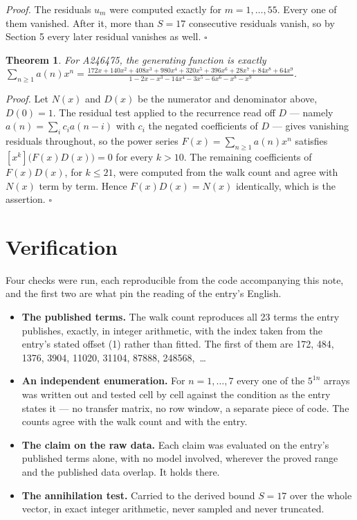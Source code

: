 \documentclass[11pt]{article}
\newtheorem{theorem}{Theorem}
\theoremstyle{definition}
\begin{document}
{\itshape Proof.} The residuals $u_m$ were computed exactly for $m = 1,\dots,55$. Every one of them vanished. After it, more than $S = 17$ consecutive residuals vanish, so by Section 5 every later residual vanishes as well. $\square$

\begin{theorem} For A246475, the generating function is exactly $\sum_{n\ge 1} a(n)x^n = \frac{172x + 140x^{2} + 408x^{3} + 980x^{4} + 320x^{5} + 396x^{6} + 28x^{7} + 84x^{8} + 64x^{9}}{1 - 2x - x^{3} - 14x^{4} - 3x^{5} - 6x^{6} - x^{8} - x^{9}}$.\end{theorem}

{\itshape Proof.} Let $N(x)$ and $D(x)$ be the numerator and denominator above, $D(0)=1$. The residual test applied to the recurrence read off $D$ --- namely $a(n) = \sum_i c_i a(n-i)$ with $c_i$ the negated coefficients of $D$ --- gives vanishing residuals throughout, so the power series $F(x)=\sum_{n\ge 1}a(n)x^n$ satisfies $[x^k]\bigl(F(x)D(x)\bigr) = 0$ for every $k > 10$. The remaining coefficients of $F(x)D(x)$, for $k \le 21$, were computed from the walk count and agree with $N(x)$ term by term. Hence $F(x)D(x) = N(x)$ identically, which is the assertion. $\square$

\section{Verification}

Four checks were run, each reproducible from the code accompanying this note, and the first two are what pin the reading of the entry's English.

\begin{itemize}

\item {\bfseries The published terms.} The walk count reproduces all 23 terms the entry publishes, exactly, in integer arithmetic, with the index taken from the entry's stated offset (1) rather than fitted. The first of them are 172, 484, 1376, 3904, 11020, 31104, 87888, 248568,~\dots

\item {\bfseries An independent enumeration.} For $n = 1,\dots,7$ every one of the $5^{1n}$ arrays was written out and tested cell by cell against the condition as the entry states it --- no transfer matrix, no row window, a separate piece of code. The counts agree with the walk count and with the entry.

\item {\bfseries The claim on the raw data.} Each claim was evaluated on the entry's published terms alone, with no model involved, wherever the proved range and the published data overlap. It holds there.

\item {\bfseries The annihilation test.} Carried to the derived bound $S = 17$ over the whole vector, in exact integer arithmetic, never sampled and never truncated.

\end{itemize}
\end{document}
